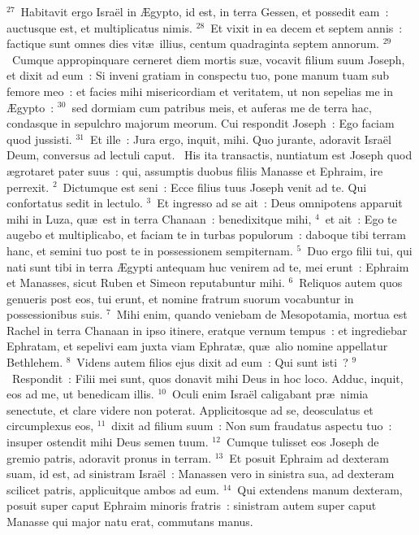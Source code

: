 ${}^{27}$~Habitavit ergo Isra\"el in \AE gypto, id est, in terra Gessen, et possedit eam~: auctusque est, et multiplicatus nimis.
${}^{28}$~Et vixit in ea decem et septem annis~: factique sunt omnes dies vit\ae\ illius, centum quadraginta septem annorum.
${}^{29}$~Cumque appropinquare cerneret diem mortis su\ae , vocavit filium suum Joseph, et dixit ad eum~: Si inveni gratiam in conspectu tuo, pone manum tuam sub femore meo~: et facies mihi misericordiam et veritatem, ut non sepelias me in \AE gypto~:
${}^{30}$~sed dormiam cum patribus meis, et auferas me de terra hac, condasque in sepulchro majorum meorum. Cui respondit Joseph~: Ego faciam quod jussisti.
${}^{31}$~Et ille~: Jura ergo, inquit, mihi. Quo jurante, adoravit Isra\"el Deum, conversus ad lectuli caput.
~His ita transactis, nuntiatum est Joseph quod \ae grotaret pater suus~: qui, assumptis duobus filiis Manasse et Ephraim, ire perrexit.
${}^{2}$~Dictumque est seni~: Ecce filius tuus Joseph venit ad te. Qui confortatus sedit in lectulo.
${}^{3}$~Et ingresso ad se ait~: Deus omnipotens apparuit mihi in Luza, qu\ae\ est in terra Chanaan~: benedixitque mihi,
${}^{4}$~et ait~: Ego te augebo et multiplicabo, et faciam te in turbas populorum~: daboque tibi terram hanc, et semini tuo post te in possessionem sempiternam.
${}^{5}$~Duo ergo filii tui, qui nati sunt tibi in terra \AE gypti antequam huc venirem ad te, mei erunt~: Ephraim et Manasses, sicut Ruben et Simeon reputabuntur mihi.
${}^{6}$~Reliquos autem quos genueris post eos, tui erunt, et nomine fratrum suorum vocabuntur in possessionibus suis.
${}^{7}$~Mihi enim, quando veniebam de Mesopotamia, mortua est Rachel in terra Chanaan in ipso itinere, eratque vernum tempus~: et ingrediebar Ephratam, et sepelivi eam juxta viam Ephrat\ae , qu\ae\ alio nomine appellatur Bethlehem.
${}^{8}$~Videns autem filios ejus dixit ad eum~: Qui sunt isti~?
${}^{9}$~Respondit~: Filii mei sunt, quos donavit mihi Deus in hoc loco. Adduc, inquit, eos ad me, ut benedicam illis.
${}^{10}$~Oculi enim Isra\"el caligabant pr\ae\ nimia senectute, et clare videre non poterat. Applicitosque ad se, deosculatus et circumplexus eos,
${}^{11}$~dixit ad filium suum~: Non sum fraudatus aspectu tuo~: insuper ostendit mihi Deus semen tuum.
${}^{12}$~Cumque tulisset eos Joseph de gremio patris, adoravit pronus in terram.
${}^{13}$~Et posuit Ephraim ad dexteram suam, id est, ad sinistram Isra\"el~: Manassen vero in sinistra sua, ad dexteram scilicet patris, applicuitque ambos ad eum.
${}^{14}$~Qui extendens manum dexteram, posuit super caput Ephraim minoris fratris~: sinistram autem super caput Manasse qui major natu erat, commutans manus.
